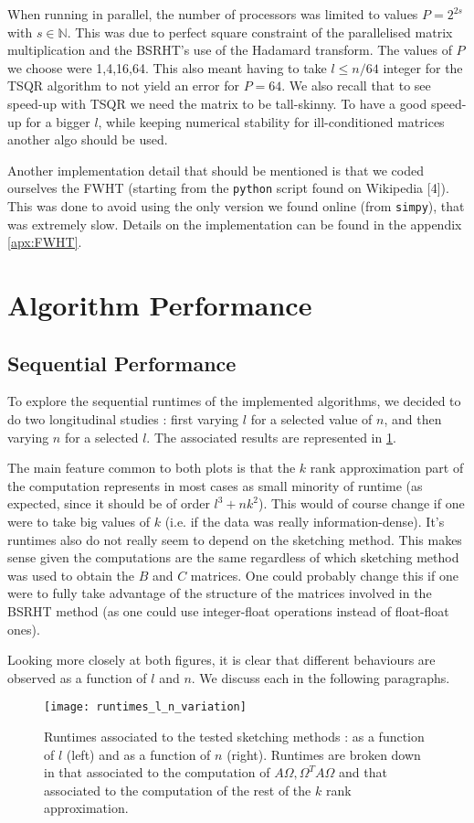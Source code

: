 \documentclass[a4paper, 12pt,oneside]{article}
\begin{document}
		When running in parallel, the number of processors was limited to values $P=2^{2s}$ with $s\in\mathbb{N}$. This was due to perfect square constraint of the parallelised matrix multiplication and the BSRHT's use of the Hadamard transform. The values of $P$ we choose were 1,4,16,64. 		
		This also meant having to take $l\le n/64$ integer for the TSQR algorithm to not yield an error for $P=64$. We also recall that to see speed-up with TSQR we need the matrix to be tall-skinny. To have a good speed-up for a bigger $l$, while keeping numerical stability for ill-conditioned matrices another algo should be used.	

		Another implementation detail that should be mentioned is that we coded ourselves the FWHT (starting from the \texttt{python} script found on Wikipedia [4]). This was done to avoid using the only version we found online (from \texttt{simpy}), that was extremely slow. Details on the implementation can be found in the appendix \ref{apx:FWHT}.
		\section{Algorithm Performance}
        \subsection{Sequential Performance}
		To explore the sequential runtimes of the implemented algorithms, we decided to do two longitudinal studies : first varying $l$ for a selected value of $n$, and then varying $n$ for a selected $l$. The associated results are represented in \ref{fig:runtimes-l-n-variation}. 

		The main feature common to both plots is that the $k$ rank approximation part of the computation represents in most cases as small minority of runtime (as expected, since it should be of order $l^3 +nk^2$). This would of course change if one were to take big values of $k$ (i.e. if the data was really information-dense).  	
		It's runtimes also do not really seem to depend on the sketching method. This makes sense given the computations are the same regardless of which sketching method was used to obtain the $B$ and $C$ matrices. One could probably change this if one were to fully take advantage of the structure of the matrices involved in the BSRHT method (as one could use integer-float operations instead of float-float ones). 

		Looking more closely at both figures, it is clear that different behaviours are observed as a function of $l$ and $n$. We discuss each in the following paragraphs.
		\begin{figure}[htb]       
			\centering             
				\vspace{0em}
				\texttt{[image: runtimes\_l\_n\_variation]}
				\caption{Runtimes associated to the tested sketching methods : as a function of $l$ (left) and as a function of $n$ (right). Runtimes are broken down in that associated to the computation of $A\Omega,\Omega^T A\Omega$ and that associated to the computation of the rest of the $k$ rank approximation.}
				\label{fig:runtimes-l-n-variation}
		\end{figure}
\end{document}
